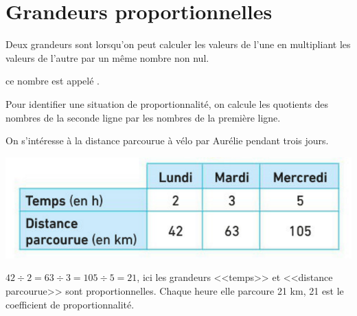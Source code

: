 \documentclass[12pt,a4paper]{article}
\date{}
\title{}
\begin{document}








\section{Grandeurs proportionnelles}

\begin{mydef}
	Deux grandeurs sont  lorsqu'on peut calculer les valeurs de l'une en multipliant les valeurs de l'autre par un même nombre non nul.
	
	ce nombre est appelé .
\end{mydef}


\begin{mymeth}
	Pour identifier une situation de proportionnalité, on calcule les quotients des nombres de la seconde ligne par les nombres de la première ligne.
\end{mymeth}

\begin{myex}
	
		On s'intéresse à la distance parcourue à vélo par Aurélie pendant trois jours.
		
		\begin{center}
			\includegraphics[scale=0.5]{tab1}
		\end{center}
	

	$42 \div 2 = 63 \div 3 = 105 \div 5 = 21$, ici les grandeurs <<temps>> et <<distance parcourue>> sont proportionnelles. Chaque heure elle parcoure 21 km, 21 est le coefficient de proportionnalité.

\end{myex}	
\end{document}
